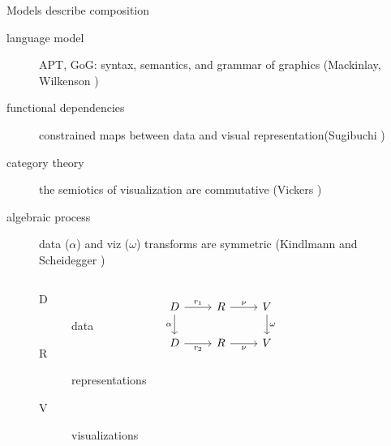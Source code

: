 \documentclass[xcolor={dvipsnames}, handout]{beamer}
\begin{document}
\begin{frame}{Models describe composition}
    \begin{description}
        \item[language model] APT, GoG: syntax, semantics, and grammar of graphics (Mackinlay, Wilkenson  \cite{mackinlayAutomatingDesignGraphical1986, mackinlayAUTOMATICDESIGNGRAPHICAL1987,wilkinsonGrammarGraphics2005})
        \item[functional dependencies] constrained maps between data and visual representation(Sugibuchi \cite{sugibuchiFramwork2009}) 
        \item[category theory] the semiotics of visualization are commutative (Vickers \cite{vickersUnderstandingViz2013})
        \item[algebraic process] data ($\alpha$) and viz ($\omega$) transforms are symmetric (Kindlmann and Scheidegger \cite{kindlmannAlgebraicProcessVisualization2014})
        \begin{columns}
       
            \begin{description}
                \item[D] data 
                \item[R] representations
                \item[V] visualizations
            \end{description}
            \begin{equation*}
                \begin{tikzcd}[ampersand replacement=\&]
                    D \arrow[d, "\alpha"'] \arrow[r, "r_1"] \& R \arrow[r, "\nu"]  \& V \arrow[d, "\omega"] \\
                    D \arrow[r, "r_2"']                     \& R \arrow[r, "\nu"'] \& V                    
                \end{tikzcd}
                \end{equation*}
       
        \end{columns} 
     
    \end{description}
\end{frame}
\end{document}
